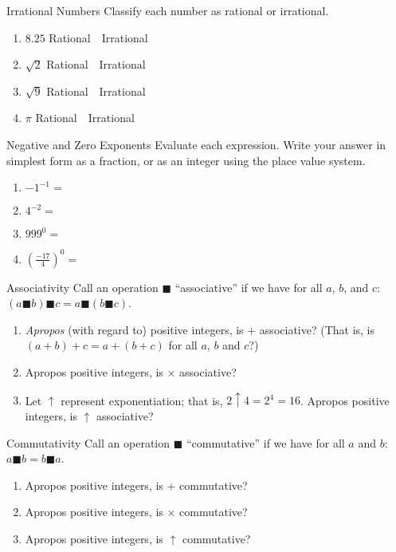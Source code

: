 \documentclass[12pt,a4paper]{article}
\begin{document}
\begin{problem}{Irrational Numbers}
 Classify each number as rational or irrational.

 \begin{enumerate}[\hspace{.5cm}a.]
  \item $8.25$ \hfill Rational~~Irrational
  \item $\sqrt{2}$ \hfill Rational~~Irrational
  \item $\sqrt{9}$ \hfill Rational~~Irrational
  \item $\pi$ \hfill Rational~~Irrational
 \end{enumerate}
\end{problem}

\begin{problem}{Negative and Zero Exponents}
 Evaluate each expression. Write your answer in simplest form as a fraction, or
 as an integer using the place value system.

 \begin{enumerate}[\hspace{.5cm}a.]
  \item ${-1}^{-1}=$ \hfill\blankC
  \item $4^{-2}=$ \hfill\blankC
  \item ${999}^0=$ \hfill\blankC
  \item ${\left(\frac{-17}{4}\right)}^0=$ \hfill\blankC
 \end{enumerate}
\end{problem}

\begin{problem}{Associativity}
 Call an operation $\blacksquare$ ``associative'' if we have for all $a$, $b$,
 and $c$: $(a \blacksquare b) \blacksquare c = a \blacksquare (b \blacksquare
 c)$.

 \begin{enumerate}[\hspace{.5cm}a.]
  \item \emph{Apropos} (with regard to) positive integers, is $+$ associative?
  (That is, is $(a+b)+c=a+(b+c)$ for all $a$, $b$ and $c$?)
  \item Apropos positive integers, is $\times$ associative?
  \item Let $\uparrow$ represent exponentiation; that is, $2\uparrow4=2^4=16$.
  Apropos positive integers, is $\uparrow$ associative?
 \end{enumerate}
\end{problem}

\begin{problem}{Commutativity}
 Call an operation $\blacksquare$ ``commutative'' if we have for all $a$ and
 $b$: $a \blacksquare b = b \blacksquare a$.

 \begin{enumerate}[\hspace{.5cm}a.]
  \item Apropos positive integers, is $+$ commutative?
  \item Apropos positive integers, is $\times$ commutative?
  \item Apropos positive integers, is $\uparrow$ commutative?
 \end{enumerate}
\end{problem}
\end{document}
